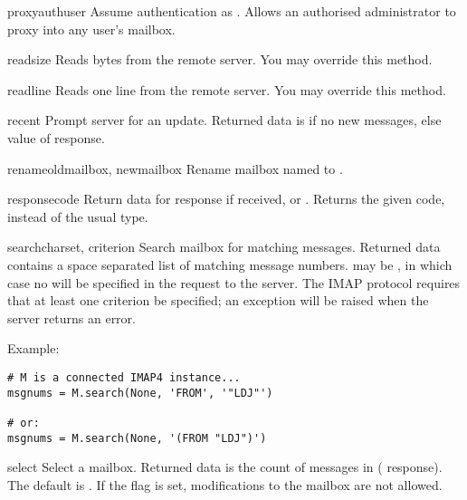 \begin{methoddesc}{proxyauth}{user}
  Assume authentication as .
  Allows an authorised administrator to proxy into any user's mailbox.
\end{methoddesc}

\begin{methoddesc}{read}{size}
  Reads  bytes from the remote server.
  You may override this method.
\end{methoddesc}

\begin{methoddesc}{readline}{}
  Reads one line from the remote server.
  You may override this method.
\end{methoddesc}

\begin{methoddesc}{recent}{}
  Prompt server for an update. Returned data is  if no new
  messages, else value of  response.
\end{methoddesc}

\begin{methoddesc}{rename}{oldmailbox, newmailbox}
  Rename mailbox named  to .
\end{methoddesc}

\begin{methoddesc}{response}{code}
  Return data for response  if received, or
  . Returns the given code, instead of the usual type.
\end{methoddesc}

\begin{methoddesc}{search}{charset, criterion}
  Search mailbox for matching messages.  Returned data contains a space
  separated list of matching message numbers.   may be
  , in which case no  will be specified in the
  request to the server.  The IMAP protocol requires that at least one
  criterion be specified; an exception will be raised when the server
  returns an error.

  Example:

\begin{verbatim}
# M is a connected IMAP4 instance...
msgnums = M.search(None, 'FROM', '"LDJ"')

# or:
msgnums = M.search(None, '(FROM "LDJ")')
\end{verbatim}
\end{methoddesc}

\begin{methoddesc}{select}{}
  Select a mailbox. Returned data is the count of messages in
   ( response).  The default 
  is .  If the  flag is set, modifications
  to the mailbox are not allowed.
\end{methoddesc}

